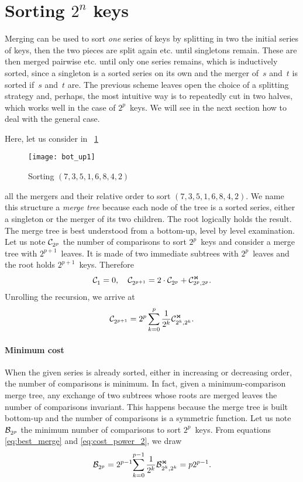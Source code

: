 \section{Sorting $2^n$ keys}

Merging can be used to sort \emph{one} series of keys by splitting in
two the initial series of keys, then the two pieces are split again
etc. until singletons remain. These are then merged pairwise
etc. until only one series remains, which is inductively sorted, since
a singleton is a sorted series on its own and the merger of~\(s\)
and~\(t\) is sorted if~\(s\) and~\(t\) are. The previous scheme leaves
open the choice of a splitting strategy and, perhaps, the most
intuitive way is to repeatedly cut in two halves, which works well in
the case of \(2^p\)~keys. We will see in the next section how to deal
with the general case.

Here, let us consider in \fig~\ref{fig:bot_up1}
\begin{figure}
\centering
\texttt{[image: bot\_up1]}
\caption{Sorting \((7,3,5,1,6,8,4,2)\)
\label{fig:bot_up1}}
\end{figure}
all the mergers and their relative order to sort
\((7,3,5,1,6,8,4,2)\). We name this structure a \emph{merge tree}
because each node of the tree is a sorted series, either a singleton
or the merger of its two children. The root logically holds the
result. The merge tree is best understood from a bottom-up, level
by level examination. Let us note \(\mathcal{C}_{2^p}^{}\) the number of
comparisons to sort \(2^p\)~keys and consider a merge tree with
\(2^{p+1}\)~leaves. It is made of two immediate subtrees with
\(2^p\)~leaves and the root holds \(2^{p+1}\)~keys. Therefore
\begin{equation*}
\mathcal{C}_{1}^{} = 0,
\quad
\mathcal{C}_{2^{p+1}}^{} = 2 \cdot \mathcal{C}_{2^p}^{} + \mathcal{C}_{2^p,2^p}^{\Join}.
\end{equation*}
Unrolling the recursion, we arrive at
\begin{equation}
\abovedisplayskip=0pt
\belowdisplayskip=0pt
\C{}{2^{p+1}} = 2^p\sum_{k=0}^p{\frac{1}{2^k}\C{\Join}{2^k,2^k}}.
\label{eq:cost_power_2}
\end{equation}

\paragraph{Minimum cost}

When the given series is already sorted, either in increasing or
decreasing order, the number of comparisons is minimum. In fact, given
a minimum-comparison merge tree, any exchange of two subtrees
whose roots are merged leaves the number of comparisons
invariant. This happens because the merge tree is built bottom-up
and the number of comparisons is a symmetric function. Let us note
\(\mathcal{B}_{2^p}^{}\) the minimum number of comparisons to sort
\(2^p\)~keys. From equations \eqref{eq:best_merge} and
\eqref{eq:cost_power_2}, we draw
\begin{equation}
\abovedisplayskip=0pt
\belowdisplayskip=0pt
\B{}{2^p}
  = 2^{p-1}\!\sum_{k=0}^{p-1}{\frac{1}{2^k}\B{\Join}{2^k,2^k}}
  = p2^{p-1}.\label{eq:best_power}
\end{equation}

